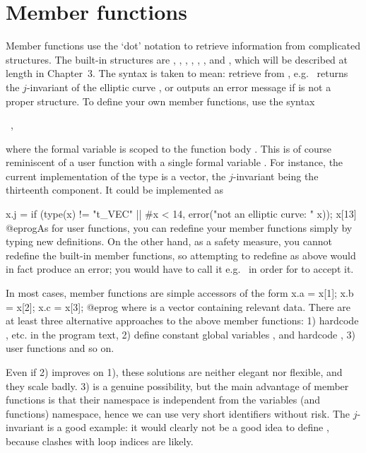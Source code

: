 \section{Member functions} \label{se:member}

Member functions use the `dot' notation to retrieve information from
complicated structures. The built-in structures are , ,
, , , ,  and , which
will be described at length in Chapter~3. The syntax 
is taken to mean: retrieve  from ,
e.g.~ returns the $j$-invariant of the elliptic curve ,
or outputs an error message if  is not a proper  structure.
To define your own member functions, use the syntax

\ ,

\noindent where the formal variable  is scoped to the function
body . This is of course reminiscent of a user function with a
single formal variable . For instance, the current implementation of
the  type is a vector, the $j$-invariant being the thirteenth
component. It could be implemented as

\bprog
x.j =
{
  if (type(x) != "t_VEC" || #x < 14, error("not an elliptic curve: " x));
  x[13]
}
@eprog\noindent As for user functions, you can redefine your member functions
simply by typing new definitions. On the other hand, as a safety measure, you
cannot redefine the built-in member functions, so attempting to redefine
 as above would in fact produce an error; you would have to call it
e.g.~ in order for  to accept it.

 In most cases, member functions are simple accessors
of the form
\bprog
  x.a = x[1];
  x.b = x[2];
  x.c = x[3];
@eprog\noindent
where  is a vector containing relevant data. There are at least
three alternative approaches to the above member functions: 1) hardcode
, etc. in the program text, 2) define constant global variables
,   and hardcode , 3)
user functions  and so on.

Even if 2) improves on 1), these solutions are neither elegant nor flexible,
and they scale badly. 3) is a genuine possibility, but the main advantage of
member functions is that their namespace is independent from the variables
(and functions) namespace, hence we can use very short identifiers without
risk. The $j$-invariant is a good example: it would clearly not be a good
idea to define , because clashes with loop indices are
likely.

